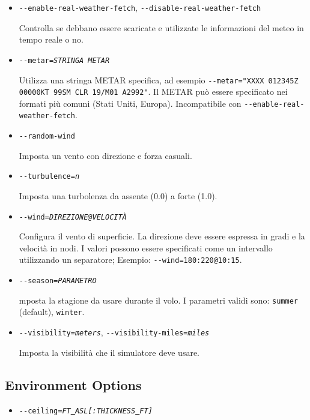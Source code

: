 \begin{itemize}
{\begin{itemize}
  Imposta un banco di nuvole ad una particolare altezza, e con uno spessore opzionale (di default \`{e} 2000ft).

  \item{\texttt{-$ $-enable-real-weather-fetch}, \texttt{-$ $-disable-real-weather-fetch}}

  Controlla se debbano essere scaricate e utilizzate le informazioni del meteo in tempo reale o no.

  \item{\texttt{-$ $-metar={\it STRINGA METAR}}}

  Utilizza una stringa METAR specifica, ad esempio \texttt{-$ $-metar="XXXX 012345Z 00000KT 99SM CLR 19/M01 A2992"}.
  Il METAR pu\`{o} essere specificato nei formati pi\`{u} comuni (Stati Uniti, Europa). Incompatibile con
  \texttt{-$ $-enable-real-weather-fetch}.

  \item{\texttt{-$ $-random-wind}}

  Imposta un vento con direzione e forza casuali.

  \item{\texttt{-$ $-turbulence={\it n}}}

  Imposta una turbolenza da assente (0.0) a forte (1.0).

  \item{\texttt{-$ $-wind={\it DIREZIONE@VELOCIT\`{A}}}}

  Configura il vento di superficie. La direzione deve essere espressa in gradi e la velocit\`{a} in nodi.
  I valori possono essere specificati come un intervallo utilizzando un separatore;
  Esempio: \texttt{-$ $-wind=180:220@10:15}.

  \item{\texttt{-$ $-season={\it PARAMETRO}}}

  mposta la stagione da usare durante il volo. I parametri validi sono: \texttt{summer} (default), \texttt{winter}.

  \item{\texttt{-$ $-visibility={\it meters}}, \texttt{-$ $-visibility-miles={\it miles}}}

  Imposta la visibilit\`{a} che il simulatore deve usare.

  \end{itemize}
}
{

  \subsection{Environment Options}
  \begin{itemize}
  \item{\texttt{-$ $-ceiling={\it FT\underline{~}ASL[:THICKNESS\underline{~}FT]}}}


\end{itemize}}
\end{itemize}
